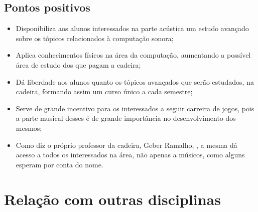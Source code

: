 \documentclass{article}
\begin{document}
\subsection{Pontos positivos}
\begin{itemize}
    \item Disponibiliza aos alunos interessados na parte acústica um estudo avançado sobre os tópicos relacionados à computação sonora;
    \item Aplica conhecimentos físicos na área da computação, aumentando a possível área de estudo dos que pagam a cadeira;
    \item Dá liberdade aos alunos quanto os tópicos avançados que serão estudados, na cadeira, formando assim um curso único a cada semestre;
    \item Serve de grande incentivo para os interessados a seguir carreira de jogos, pois a parte musical desses é de grande importância no desenvolvimento dos mesmos;
    \item Como diz o próprio professor da cadeira, Geber Ramalho, \citep{SiteDisciplina}, a mesma dá acesso a todos os interessados na área, não apenas a músicos, como alguns esperam por conta do nome.
\end{itemize}

\section{Relação com outras disciplinas}
\end{document}
